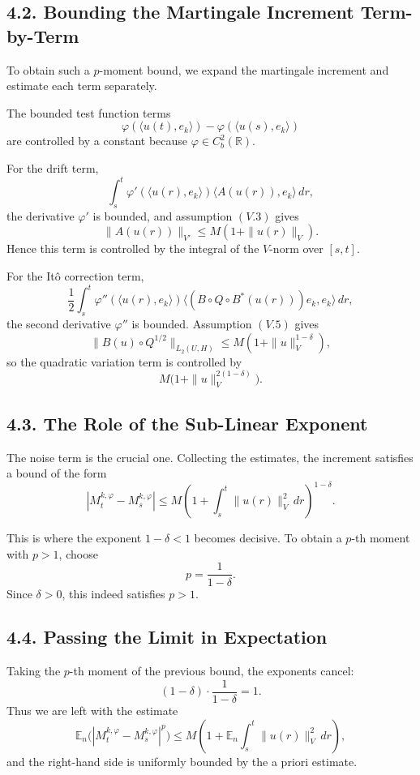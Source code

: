 \documentclass[11pt]{article}
\theoremstyle{definition}
\theoremstyle{remark}
\begin{document}
\subsection*{4.2. Bounding the Martingale Increment Term-by-Term}
To obtain such a \(p\)-moment bound, we expand the martingale increment and estimate each term separately.

The bounded test function terms
\[
\varphi(\langle u(t),e_k\rangle)-\varphi(\langle u(s),e_k\rangle)
\]
are controlled by a constant because \(\varphi\in C_b^2(\mathbb R)\).

For the drift term,
\[
\int_s^t \varphi'(\langle u(r),e_k\rangle)\langle A(u(r)),e_k\rangle\,dr,
\]
the derivative \(\varphi'\) is bounded, and assumption \((V.3)\) gives
\[
\|A(u(r))\|_{V'}\le M(1+\|u(r)\|_V).
\]
Hence this term is controlled by the integral of the \(V\)-norm over \([s,t]\).

For the It\^o correction term,
\[
\frac12 \int_s^t
\varphi''(\langle u(r),e_k\rangle)
\langle (B\circ Q\circ B^*(u(r)))e_k,e_k\rangle\,dr,
\]
the second derivative \(\varphi''\) is bounded. Assumption \((V.5)\) gives
\[
\|B(u)\circ Q^{1/2}\|_{L_2(U,H)}
\le
M(1+\|u\|_V^{1-\delta}),
\]
so the quadratic variation term is controlled by
\[
M\bigl(1+\|u\|_V^{2(1-\delta)}\bigr).
\]

\subsection*{4.3. The Role of the Sub-Linear Exponent}
The noise term is the crucial one. Collecting the estimates, the increment satisfies a bound of the form
\[
|M_t^{k,\varphi}-M_s^{k,\varphi}|
\le
M\left(1+\int_s^t \|u(r)\|_V^2\,dr\right)^{1-\delta}.
\]

This is where the exponent \(1-\delta<1\) becomes decisive. To obtain a \(p\)-th moment with \(p>1\), choose
\[
p=\frac{1}{1-\delta}.
\]
Since \(\delta>0\), this indeed satisfies \(p>1\).

\subsection*{4.4. Passing the Limit in Expectation}
Taking the \(p\)-th moment of the previous bound, the exponents cancel:
\[
(1-\delta)\cdot \frac{1}{1-\delta}=1.
\]
Thus we are left with the estimate
\[
\mathbb E_n\bigl(|M_t^{k,\varphi}-M_s^{k,\varphi}|^p\bigr)
\le
M\left(
1+\mathbb E_n\int_s^t \|u(r)\|_V^2\,dr
\right),
\]
and the right-hand side is uniformly bounded by the a priori estimate.
\end{document}
